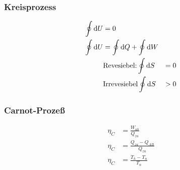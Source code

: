 \begin{multicols}{2}
\subsubsection{Kreisprozess}
\begin{align*}
\oint \mathop{}\!\mathrm{d} U&=0\\
\oint \mathop{}\!\mathrm{d} U&= \oint \mathop{}\!\mathrm{d} Q +\oint \mathop{}\!\mathrm{d} W\\
&\text{Revesiebel:}
\oint \mathop{}\!\mathrm{d} S&=0\\
&\text{Irrevesiebel}
\oint \mathop{}\!\mathrm{d} S&>0\\
\end{align*}

\subsubsection{Carnot-Prozeß}
\begin{align*}
\eta_C&=\frac{W_{ab}}{Q_{zu}}\\
\eta_C&=\frac{Q_{zu}-Q_{AB}}{Q_{zu}}\\
\eta_C&=\frac{T_h-T_n}{T_n}
\end{align*}
\vfill
\end{multicols}